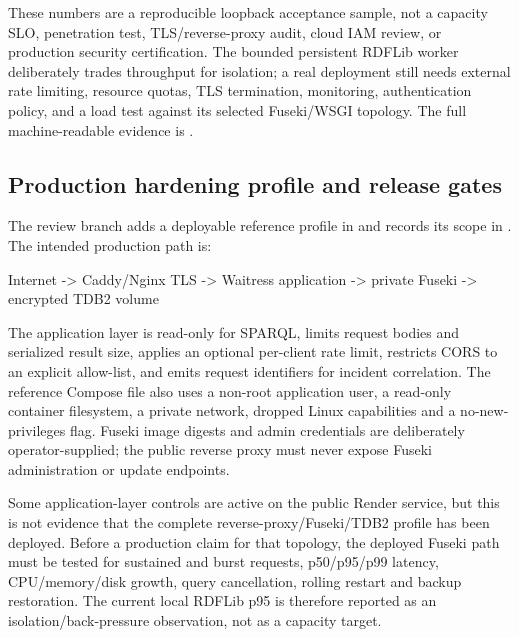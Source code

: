 These numbers are a reproducible loopback acceptance sample, not a capacity SLO, penetration
test, TLS/reverse-proxy audit, cloud IAM review, or production security certification. The
bounded persistent RDFLib worker deliberately trades throughput for isolation; a real
deployment still needs external rate limiting, resource quotas, TLS termination, monitoring,
authentication policy, and a load test against its selected Fuseki/WSGI topology. The full
machine-readable evidence is .

\subsection{Production hardening profile and release gates}
The review branch adds a deployable reference profile in  and records its
scope in . The intended production path is:
\begin{code}
Internet -> Caddy/Nginx TLS -> Waitress application -> private Fuseki -> encrypted TDB2 volume
\end{code}
The application layer is read-only for SPARQL, limits request bodies and serialized result
size, applies an optional per-client rate limit, restricts CORS to an explicit allow-list,
and emits request identifiers for incident correlation. The reference Compose file also
uses a non-root application user, a read-only container filesystem, a private network,
dropped Linux capabilities and a no-new-privileges flag. Fuseki image digests and admin
credentials are deliberately operator-supplied; the public reverse proxy must never expose
Fuseki administration or update endpoints.

Some application-layer controls are active on the public Render service, but this is not
evidence that the complete reverse-proxy/Fuseki/TDB2 profile has been deployed. Before a
production claim for that topology, the deployed Fuseki path
must be tested for sustained and burst requests, p50/p95/p99 latency, CPU/memory/disk
growth, query cancellation, rolling restart and backup restoration. The current local
RDFLib p95 is therefore reported as an isolation/back-pressure observation, not as a
capacity target.

